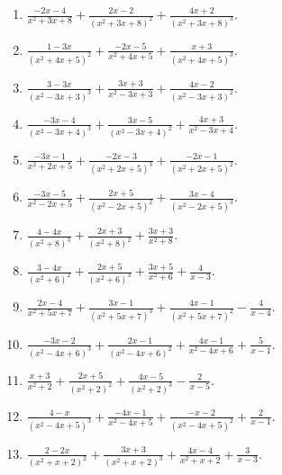 \documentclass[11pt,oneside]{book}
\begin{document}
\begin{enumerate}[leftmargin=*,label=\textbf{X\arabic*.},itemsep=0.45\baselineskip]
\item $\displaystyle \frac{- 2 x - 4}{x^{2} + 3 x + 8} + \frac{2 x - 2}{\left(x^{2} + 3 x + 8\right)^{2}} + \frac{4 x + 2}{\left(x^{2} + 3 x + 8\right)^{3}}$.
\item $\displaystyle \frac{1 - 3 x}{\left(x^{2} + 4 x + 5\right)^{2}} + \frac{- 2 x - 5}{x^{2} + 4 x + 5} + \frac{x + 3}{\left(x^{2} + 4 x + 5\right)^{3}}$.
\item $\displaystyle \frac{3 - 3 x}{\left(x^{2} - 3 x + 3\right)^{3}} + \frac{3 x + 3}{x^{2} - 3 x + 3} + \frac{4 x - 2}{\left(x^{2} - 3 x + 3\right)^{2}}$.
\item $\displaystyle \frac{- 3 x - 4}{\left(x^{2} - 3 x + 4\right)^{3}} + \frac{3 x - 5}{\left(x^{2} - 3 x + 4\right)^{2}} + \frac{4 x + 3}{x^{2} - 3 x + 4}$.
\item $\displaystyle \frac{- 3 x - 1}{x^{2} + 2 x + 5} + \frac{- 2 x - 3}{\left(x^{2} + 2 x + 5\right)^{3}} + \frac{- 2 x - 1}{\left(x^{2} + 2 x + 5\right)^{2}}$.
\item $\displaystyle \frac{- 3 x - 5}{x^{2} - 2 x + 5} + \frac{2 x + 5}{\left(x^{2} - 2 x + 5\right)^{2}} + \frac{3 x - 4}{\left(x^{2} - 2 x + 5\right)^{3}}$.
\item $\displaystyle \frac{4 - 4 x}{\left(x^{2} + 8\right)^{3}} + \frac{2 x + 3}{\left(x^{2} + 8\right)^{2}} + \frac{3 x + 3}{x^{2} + 8}$.
\item $\displaystyle \frac{3 - 4 x}{\left(x^{2} + 6\right)^{2}} + \frac{2 x + 5}{\left(x^{2} + 6\right)^{3}} + \frac{3 x + 5}{x^{2} + 6} + \frac{4}{x - 3}$.
\item $\displaystyle \frac{2 x - 4}{x^{2} + 5 x + 7} + \frac{3 x - 1}{\left(x^{2} + 5 x + 7\right)^{3}} + \frac{4 x - 1}{\left(x^{2} + 5 x + 7\right)^{2}} - \frac{4}{x - 4}$.
\item $\displaystyle \frac{- 3 x - 2}{\left(x^{2} - 4 x + 6\right)^{3}} + \frac{2 x - 1}{\left(x^{2} - 4 x + 6\right)^{2}} + \frac{4 x - 1}{x^{2} - 4 x + 6} + \frac{5}{x - 1}$.
\item $\displaystyle \frac{x + 3}{x^{2} + 2} + \frac{2 x + 5}{\left(x^{2} + 2\right)^{2}} + \frac{4 x - 5}{\left(x^{2} + 2\right)^{3}} - \frac{2}{x - 5}$.
\item $\displaystyle \frac{4 - x}{\left(x^{2} - 4 x + 5\right)^{3}} + \frac{- 4 x - 1}{x^{2} - 4 x + 5} + \frac{- x - 2}{\left(x^{2} - 4 x + 5\right)^{2}} + \frac{2}{x - 1}$.
\item $\displaystyle \frac{2 - 2 x}{\left(x^{2} + x + 2\right)^{2}} + \frac{3 x + 3}{\left(x^{2} + x + 2\right)^{3}} + \frac{4 x - 4}{x^{2} + x + 2} + \frac{3}{x - 3}$.

\end{enumerate}
\end{document}
